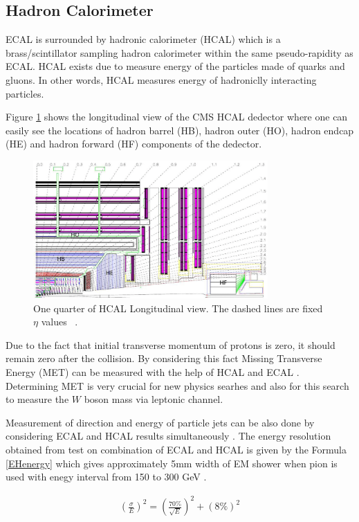 \documentclass[12pt,oneandhalf,chaparabic,phys,ms,eng]{metu}
\begin{document}
\subsection{Hadron Calorimeter}

ECAL is surrounded by hadronic calorimeter (HCAL) which is a brass/scintillator sampling hadron calorimeter within the same pseudo-rapidity as ECAL. HCAL exists due to measure energy of the particles made of quarks and gluons. In other words, HCAL measures energy of hadroniclly interacting particles.

Figure \ref{HCAL} shows the longitudinal view of the CMS HCAL dedector where one can easily see the locations of hadron barrel (HB), hadron outer (HO), hadron endcap (HE) and hadron forward (HF) components of the dedector. 

\begin{figure}  [!hbt]
\centering
    \includegraphics[width=0.8\textwidth]{HCAL}
    \caption{\label{HCAL}One quarter of HCAL Longitudinal view. The dashed lines are fixed $\eta$ values ~\cite{R16}.}
\end{figure}

Due to the fact that initial transverse momentum of protons is zero, it should remain zero after the collision. By considering this fact Missing Transverse Energy (MET) can be measured with the help of HCAL and ECAL \cite{R17}. Determining MET is very crucial for new physics searhes and also for this search to measure the $W$ boson mass via leptonic channel.

Measurement of direction and energy of particle jets can be also done by considering ECAL and HCAL results simultaneously \cite{R17}.  
The energy resolution obtained from test on combination of ECAL and HCAL is given by the Formula \ref{EHenergy} which gives approximately 5mm width of EM shower when pion is used with enegy interval from 150 to 300 GeV \cite{R16}.

\begin{eqnarray}
\label{EHenergy}
	(\frac{\sigma}{E})^2 = (\frac{70\%}{\sqrt{E}})^2 + (8\%)^2
\end{eqnarray}
\end{document}
